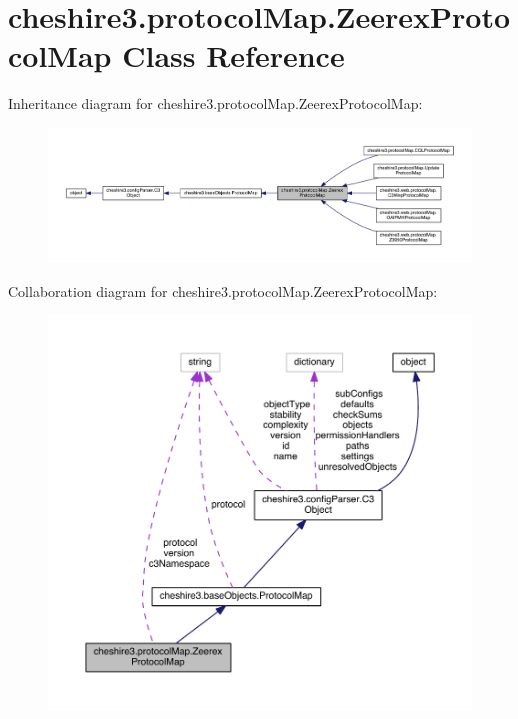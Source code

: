 \hypertarget{classcheshire3_1_1protocol_map_1_1_zeerex_protocol_map}{\section{cheshire3.\-protocol\-Map.\-Zeerex\-Protocol\-Map Class Reference}
\label{classcheshire3_1_1protocol_map_1_1_zeerex_protocol_map}
}


Inheritance diagram for cheshire3.\-protocol\-Map.\-Zeerex\-Protocol\-Map\-:
\nopagebreak
\begin{figure}[H]
\begin{center}
\leavevmode
\includegraphics[width=350pt]{classcheshire3_1_1protocol_map_1_1_zeerex_protocol_map__inherit__graph}
\end{center}
\end{figure}


Collaboration diagram for cheshire3.\-protocol\-Map.\-Zeerex\-Protocol\-Map\-:
\nopagebreak
\begin{figure}[H]
\begin{center}
\leavevmode
\includegraphics[width=350pt]{classcheshire3_1_1protocol_map_1_1_zeerex_protocol_map__coll__graph}
\end{center}
\end{figure}
